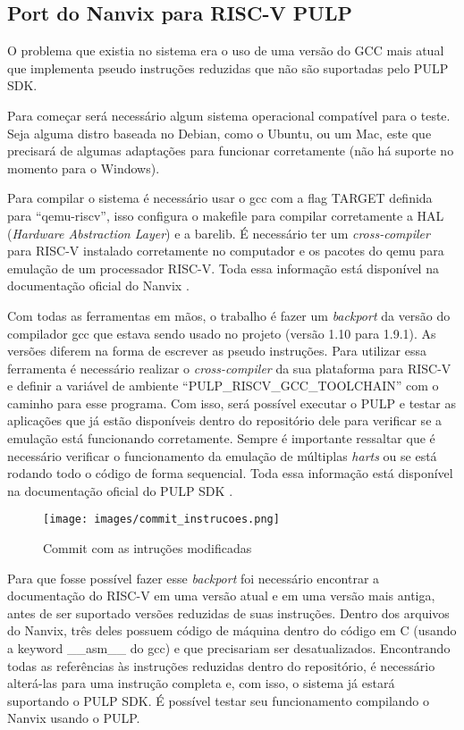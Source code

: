 \subsection{Port do Nanvix para RISC-V PULP}

O problema que existia no sistema era o uso de uma versão do GCC mais atual que implementa pseudo instruções reduzidas que não são suportadas pelo PULP SDK. 

Para começar será necessário algum sistema operacional compatível para o teste. Seja alguma distro baseada no Debian, como o Ubuntu, ou um Mac, este que 
precisará de algumas adaptações para funcionar corretamente (não há suporte no momento para o Windows). 

Para compilar o sistema é necessário usar o gcc com a flag TARGET definida para “qemu-riscv”, isso configura o makefile para compilar corretamente a 
HAL (\textit{Hardware Abstraction Layer}) e a barelib. É necessário ter um \textit{cross-compiler} para RISC-V instalado corretamente no computador e os pacotes do qemu 
para emulação de um processador RISC-V. Toda essa informação está disponível na documentação oficial do Nanvix \cite{NanvixOS}. 

Com todas as ferramentas em mãos, o trabalho é fazer um \textit{backport} da versão do compilador gcc que estava sendo usado no projeto (versão 1.10 para 1.9.1). As versões diferem na forma de escrever as pseudo instruções. Para utilizar essa ferramenta é necessário realizar o \textit{cross-compiler} da sua plataforma para RISC-V e definir a variável de ambiente “PULP\_RISCV\_GCC\_TOOLCHAIN” com o caminho para esse programa. Com isso, será possível executar o PULP e testar as aplicações que já estão disponíveis dentro do repositório dele para verificar se a emulação está funcionando corretamente. Sempre é importante ressaltar que é necessário verificar o 
funcionamento da emulação de múltiplas \textit{harts} ou se está rodando todo o código de forma sequencial. Toda essa informação está disponível na documentação oficial 
do PULP SDK \cite{PulpSDKRepositorio}.

\begin{figure}[h!]
    \centering
    \texttt{[image: images/commit\_instrucoes.png]}
    \caption{Commit com as intruções modificadas \\ \cite{SolucaoInstrucoesDOWNGrade}} %
\end{figure}

Para que fosse possível fazer esse \textit{backport} foi necessário encontrar a documentação do RISC-V em uma versão atual e em uma versão mais antiga, antes de ser suportado versões reduzidas de suas instruções. Dentro dos arquivos do Nanvix, três deles  possuem código de máquina dentro do código em C (usando a keyword \_\_asm\_\_ do gcc) e que precisariam ser desatualizados. Encontrando todas as referências às instruções reduzidas dentro do repositório, é necessário alterá-las para uma instrução completa e, com isso, o sistema já estará suportando o PULP SDK. É possível testar seu funcionamento compilando o Nanvix usando o PULP.

